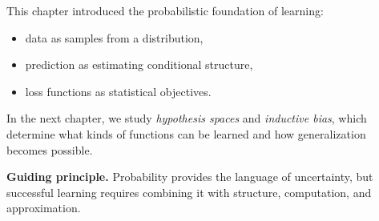 This chapter introduced the probabilistic foundation of learning:
\begin{itemize}
    \item data as samples from a distribution,
    \item prediction as estimating conditional structure,
    \item loss functions as statistical objectives.
\end{itemize}

\medskip

In the next chapter, we study \emph{hypothesis spaces} and \emph{inductive bias}, which determine what kinds of functions can be learned and how generalization becomes possible.

\medskip

\noindent
\textbf{Guiding principle.}  
Probability provides the language of uncertainty, but successful learning requires combining it with structure, computation, and approximation.
